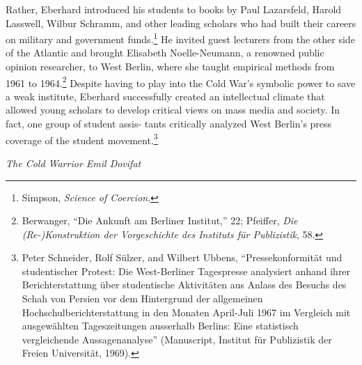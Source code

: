 \documentclass{tufte-handout}
\begin{document}
Rather, Eberhard introduced his students to books by Paul Lazarsfeld,
Harold Lasswell, Wilbur Schramm, and other leading scholars who had
built their careers on military and government funds.\footnote{Simpson,
  \emph{Science of Coercion}.} He invited guest lecturers from the other
side of the Atlantic and brought Elisabeth Noelle-Neumann, a renowned
public opinion researcher, to West Berlin, where she taught empirical
methods from 1961 to 1964.\footnote{Berwanger, ``Die Ankunft am Berliner
  Institut,'' 22; Pfeiffer, \emph{Die (Re-)Konstruktion der
  Vorgeschichte des Instituts für Publizistik}, 58.} Despite having to
play into the Cold War's symbolic power to save a weak institute,
Eberhard successfully created an intellectual climate that allowed young
scholars to develop critical views on mass media and society. In fact,
one group of student assis-
\newpage
\noindent tants critically analyzed West Berlin's press
coverage of the student movement.\footnote{Peter Schneider, Rolf Sülzer,
  and Wilbert Ubbens, ``Pressekonformität und studentischer Protest: Die
  West-Berliner Tagespresse analysiert anhand ihrer Berichterstattung
  über studentische Aktivitäten aus Anlass des Besuchs des Schah von
  Persien vor dem Hintergrund der allgemeinen Hochschulberichterstattung
  in den Monaten April-Juli 1967 im Vergleich mit ausgewählten
  Tageszeitungen ausserhalb Berlins: Eine statistisch vergleichende
  Aussagenanalyse'' (Manuscript, Institut für Publizistik der Freien
  Universität, 1969).}
  
  
  \vspace*{0.75em} 

\begin{centering}

\noindent \emph{The Cold Warrior Emil Dovifat}

\end{centering}


\vspace*{0.5em} 
\end{document}
